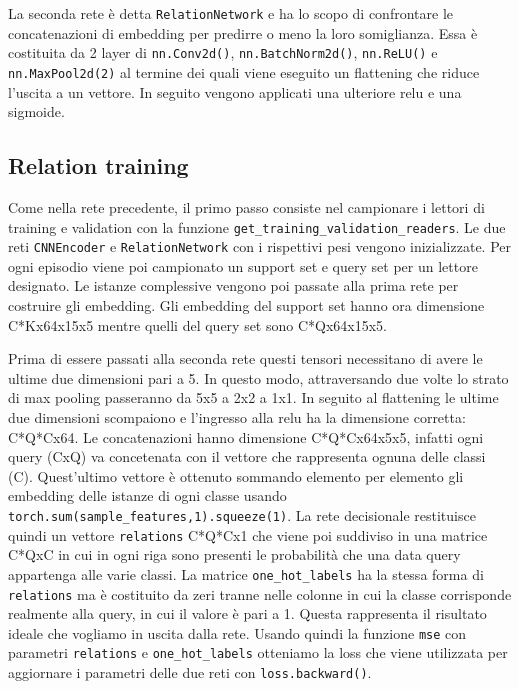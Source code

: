 \documentclass[12pt,a4paper,titlepage]{article}
\begin{document}
La seconda rete è detta \texttt{RelationNetwork} e ha lo scopo di confrontare le concatenazioni di embedding per predirre o meno la loro somiglianza.
Essa è costituita da 2 layer di \texttt{nn.Conv2d()}, \texttt{nn.BatchNorm2d()}, \texttt{nn.ReLU()} e \texttt{nn.MaxPool2d(2)} al termine dei quali viene eseguito un flattening che riduce l'uscita a un vettore.
In seguito vengono applicati una ulteriore relu e una sigmoide.
\subsection{Relation training}
Come nella rete precedente, il primo passo consiste nel campionare i lettori di training e validation con la funzione \texttt{get\_training\_validation\_readers}.
Le due reti \texttt{CNNEncoder} e \texttt{RelationNetwork} con i rispettivi pesi vengono inizializzate.
Per ogni episodio viene poi campionato un support set e query set per un lettore designato.
Le istanze complessive vengono poi passate alla prima rete per costruire gli embedding.
Gli embedding del support set hanno ora dimensione C*Kx64x15x5 mentre quelli del query set sono C*Qx64x15x5.

Prima di essere passati alla seconda rete questi tensori necessitano di avere le ultime due dimensioni pari a 5.
In questo modo, attraversando due volte lo strato di max pooling passeranno da 5x5 a 2x2 a 1x1.
In seguito al flattening le ultime due dimensioni scompaiono e l'ingresso alla relu ha la dimensione corretta: C*Q*Cx64.
Le concatenazioni hanno dimensione C*Q*Cx64x5x5, infatti ogni query (CxQ) va concetenata con il vettore che rappresenta ognuna delle classi (C).
Quest'ultimo vettore è ottenuto sommando elemento per elemento gli embedding delle istanze di ogni classe usando \texttt{torch.sum(sample\_features,1).squeeze(1)}.
La rete decisionale restituisce quindi un vettore \texttt{relations} C*Q*Cx1 che viene poi suddiviso in una matrice C*QxC in cui in ogni riga sono presenti le probabilità che una data query appartenga alle varie classi.
La matrice \texttt{one\_hot\_labels} ha la stessa forma di \texttt{relations} ma è costituito da zeri tranne nelle colonne in cui la classe corrisponde realmente alla query, in cui il valore è pari a 1.
Questa rappresenta il risultato ideale che vogliamo in uscita dalla rete.
Usando quindi la funzione \texttt{mse} con parametri \texttt{relations} e \texttt{one\_hot\_labels} otteniamo la loss che viene utilizzata per aggiornare i parametri delle due reti con \texttt{loss.backward()}.
\end{document}
